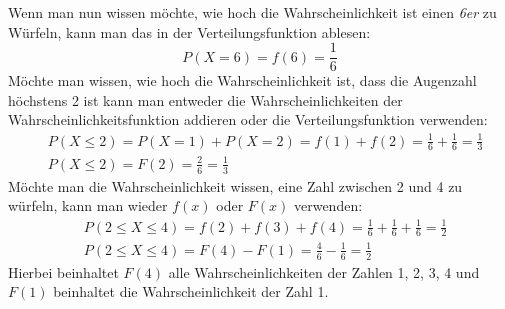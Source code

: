 \begin{bsp}

    Wenn man nun wissen möchte, wie hoch die Wahrscheinlichkeit ist einen \emph{6er} zu Würfeln, kann man das in der Verteilungsfunktion ablesen:
    \[ 
        P(X=6) = f(6) = \frac{1}{6}
    \]
    Möchte man wissen, wie hoch die Wahrscheinlichkeit ist, dass die Augenzahl höchstens 2 ist kann man entweder die Wahrscheinlichkeiten der Wahrscheinlichkeitsfunktion addieren oder die Verteilungsfunktion verwenden:
    \begin{align*}
        &P(X \leq 2) = P(X=1) + P(X=2) = f(1) + f(2) = \frac{1}{6} + \frac{1}{6} = \frac{1}{3} \\
        &P(X\leq 2) = F(2) = \frac{2}{6} = \frac{1}{3}
    \end{align*}
    Möchte man die Wahrscheinlichkeit wissen, eine Zahl zwischen 2 und 4 zu würfeln, kann man wieder $f(x)$ oder $F(x)$ verwenden:
    \begin{align*}
        &P(2 \leq X \leq 4) = f(2) + f(3) + f(4) = \frac{1}{6} + \frac{1}{6} + \frac{1}{6} = \frac{1}{2} \\
        &P(2 \leq X \leq 4) = F(4) - F(1) = \frac{4}{6} - \frac{1}{6} = \frac{1}{2}
    \end{align*}
    Hierbei beinhaltet $F(4)$ alle Wahrscheinlichkeiten der Zahlen 1, 2, 3, 4 und $F(1)$ beinhaltet die Wahrscheinlichkeit der Zahl 1.
\end{bsp}
    

